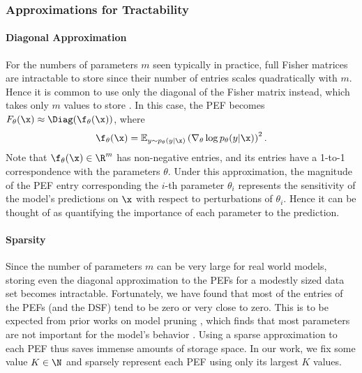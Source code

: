 \documentclass[dvipsnames]{article}
\begin{document}
\subsubsection{Approximations for Tractability}\label{sec:approx_tract}

\paragraph{Diagonal Approximation}
For the numbers of parameters $m$ seen typically in practice, full Fisher matrices are intractable to store since their number of entries scales quadratically with $m$.%
Hence it is common to use only the diagonal of the Fisher matrix instead, which takes only $m$ values to store \cite{kirkpatrick2017overcoming}.
In this case, the PEF becomes $F_\theta(\x) \approx \Diag(\f_\theta(\x))$, where 
\begin{equation}\label{eq:dense_pef_vector}
    \f_\theta(\x) = \mathbb E_{y\sim p_\theta(y|\x)} \left(\nabla_\theta \log p_\theta(y|\x)\right)^2.
\end{equation}
Note that $\f_\theta(\x) \in \R^m$ has non-negative entries, and its entries have a 1-to-1 correspondence with the parameters $\theta$.
Under this approximation, the magnitude of the PEF entry corresponding the $i$-th parameter $\theta_i$ represents the sensitivity of the model's predictions on $\x$ with respect to perturbations of $\theta_i$.
Hence it can be thought of as quantifying the importance of each parameter to the prediction.

\paragraph{Sparsity}
Since the number of parameters $m$ can be very large for real world models, storing even the diagonal approximation to the PEFs for a modestly sized data set becomes intractable.
Fortunately, we have found that most of the entries of the PEFs (and the DSF) tend to be zero or very close to zero.
This is to be expected from prior works on model pruning \citep{hoefler2021sparsity}, which finds that most parameters are not important for the model's behavior \citep{frankle2018lottery}.
Using a sparse approximation to each PEF thus saves immense amounts of storage space.
In our work, we fix some value $K \in \N$ and sparsely represent each PEF using only its largest $K$ values.
\end{document}
